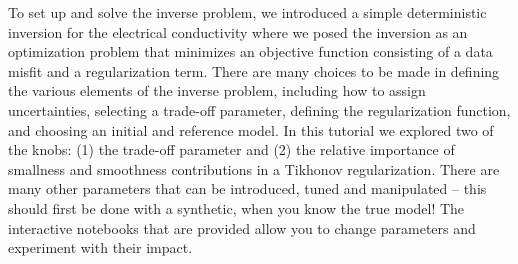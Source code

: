 \documentclass[11pt,oneside]{article}
\begin{document}
To set up and solve the inverse problem, we introduced a simple deterministic inversion for the electrical conductivity where we posed the inversion as an optimization problem that minimizes an objective function consisting of a data misfit and a regularization term. There are many choices to be made in defining the various elements of the inverse problem, including how to assign uncertainties, selecting a trade-off parameter, defining the regularization function, and choosing an initial and reference model. In this tutorial we explored two of the knobs: (1) the trade-off parameter and (2) the relative importance of smallness and smoothness contributions in a Tikhonov regularization. There are many other parameters that can be introduced, tuned and manipulated -- this should first be done with a synthetic, when you know the true model! The interactive notebooks that are provided allow you to change parameters and experiment with their impact.

\clearpage

\end{document}

